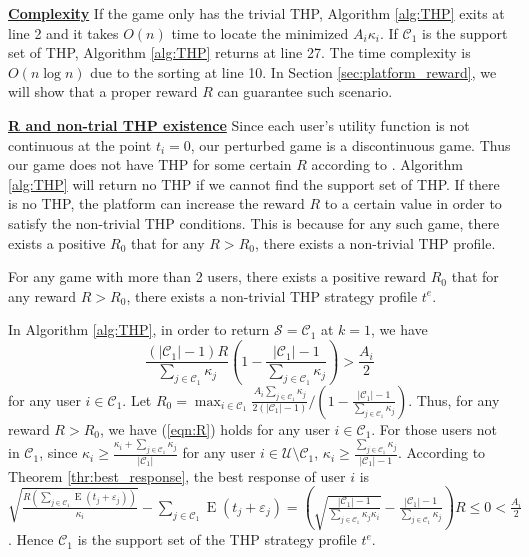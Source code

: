 \documentclass{IEEEtran}
\begin{document}
\noindent \textbf{\underline{Complexity}} If the game only has the trivial THP, Algorithm \ref{alg:THP} exits at line 2 and it takes $O(n)$ time to locate the minimized $A_i\kappa_i$. 
If $\mathcal{C}_1$ is the support set of THP, Algorithm \ref{alg:THP} returns at line 27. The time complexity is $O(n\log n)$ due to the sorting at line 10. In Section \ref{sec:platform_reward}, we will show that a proper reward $R$ can guarantee such scenario.

\medskip

\noindent \textbf{\underline{R and non-trial THP existence}} Since each user's utility function is not continuous at the point $t_i=0$, our perturbed game is a discontinuous game. Thus our game does not have THP for some certain $R$ according to \cite{carbonell:discontinuous}. Algorithm \ref{alg:THP} will return no THP if we cannot find the support set of THP. If there is no THP, the platform can increase the reward $R$ to a certain value in order to satisfy the non-trivial THP conditions. This is because for any such game, there exists a positive $R_0$ that for any $R>R_0$, there exists a non-trivial THP profile. %

\begin{theorem}
\label{thm:te_exists}
For any game with more than 2 users, there exists a positive reward $R_0$ that for any reward $R>R_0$, there exists a non-trivial THP strategy profile $t^{e}$.
\end{theorem}
\begin{IEEEproof}
In Algorithm \ref{alg:THP}, in order to return $\mathcal{S}=\mathcal{C}_1$ at $k=1$, we have
\begin{equation}
\label{eqn:R}
\frac{(|\mathcal{C}_1|-1)R}{\sum_{j\in\mathcal{C}_1}\kappa_j}(1-\frac{|\mathcal{C}_1|-1}{\sum_{j\in\mathcal{C}_1}\kappa_j})>\frac{A_i}{2}
\end{equation}
for any user $i\in\mathcal{C}_1$. Let $R_0=\max_{i\in\mathcal{C}_1}\frac{A_i\sum_{j\in\mathcal{C}_1}\kappa_j}{2(|\mathcal{C}_1|-1)}/(1-\frac{|\mathcal{C}_1|-1}{\sum_{j\in\mathcal{C}_1}\kappa_j})$. Thus, for any reward $R>R_0$, we have (\ref{eqn:R}) holds for any user $i\in\mathcal{C}_1$. For those users not in $\mathcal{C}_1$, since $\kappa_i\geq \frac{\kappa_i+\sum_{j\in\mathcal{C}_1}\kappa_j}{|\mathcal{C}_1|}$ for any user $i\in\mathcal{U}\setminus\mathcal{C}_1$, $\kappa_i\geq \frac{\sum_{j\in\mathcal{C}_1}\kappa_j}{|\mathcal{C}_1|-1}$. According to Theorem \ref{thr:best_response}, the best response of user $i$ is $\sqrt{\frac{R(\sum_{j\in \mathcal{C}_1}\operatorname{E}(t_j+\varepsilon_j))}{\kappa_i}}-\sum_{j\in \mathcal{C}_1}\operatorname{E}(t_j+\varepsilon_j)=(\sqrt{\frac{|\mathcal{C}_1|-1}{\sum_{j\in\mathcal{C}_1}\kappa_j\kappa_i}}-\frac{|\mathcal{C}_1|-1}{\sum_{j\in\mathcal{C}_1}\kappa_j})R \leq 0 < \frac{A_i}{2}$. Hence $\mathcal{C}_1$ is the support set of the THP strategy profile $t^{e}$.
\end{IEEEproof}
\end{document}
